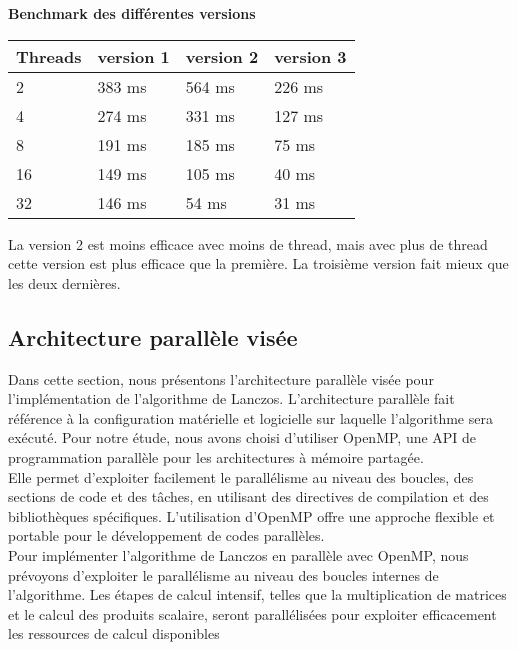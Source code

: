 \documentclass[11pt,french]{article}
\begin{document}
	\noindent \textbf{Benchmark des différentes versions}
	\begin{table}[h]
		\centering
		\begin{tabular}{ |p{2cm}|p{2cm}|p{2cm}|p{2cm}|  }
			\hline
			Threads & version 1 & version 2 & version 3\\
			\hline
			2  &  383  ms&  564 ms & 226 ms\\
			4  &  274  ms&   331 ms & 127 ms\\
			8  & 191 ms&  185 ms & 75 ms\\
			16  & 149 ms&  105 ms & 40 ms\\
			32 & 146 ms&  54 ms & 31 ms\\
			\hline
		\end{tabular}
	\end{table}
	
	 \par La version 2 est moins efficace avec moins de thread, mais avec plus de thread cette version est plus efficace que la première. La troisième version fait mieux que les deux dernières.
	 
	\newpage
    \subsection{Architecture parallèle visée}
    Dans cette section, nous présentons l'architecture parallèle visée pour l'implémentation de l'algorithme de Lanczos. L'architecture parallèle fait référence à la configuration matérielle et logicielle sur laquelle l'algorithme sera exécuté. Pour notre étude, nous avons choisi d'utiliser OpenMP, une API de programmation parallèle pour les architectures à mémoire partagée. \\
    
    Elle permet d'exploiter facilement le parallélisme au niveau des boucles, des sections de code et des tâches, en utilisant des directives de compilation et des bibliothèques spécifiques. L'utilisation d'OpenMP offre une approche flexible et portable pour le développement de codes parallèles. \\
    
    Pour implémenter l'algorithme de Lanczos en parallèle avec OpenMP, nous prévoyons d'exploiter le parallélisme au niveau des boucles internes de l'algorithme. Les étapes de calcul intensif, telles que la multiplication de matrices et le calcul des produits scalaire, seront parallélisées pour exploiter efficacement les ressources de calcul disponibles
    
\end{document}
